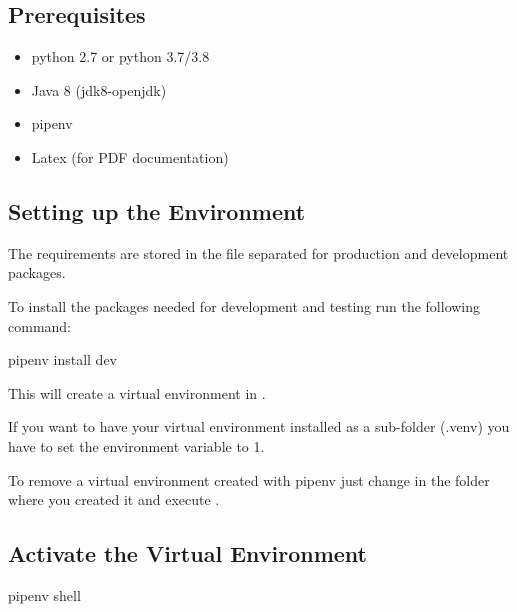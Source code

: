 \documentclass[a4paper,10pt, twoside,english]{sphinxmanual}
\begin{document}
\subsection{Prerequisites}
\label{\detokenize{setup_development_testing:prerequisites}}\begin{itemize}
\item {} 
python 2.7 or python 3.7/3.8

\item {} 
Java 8 (jdk8-openjdk)

\item {} 
pipenv

\item {} 
Latex (for PDF documentation)

\end{itemize}


\subsection{Setting up the Environment}
\label{\detokenize{setup_development_testing:setting-up-the-environment}}
The requirements are stored in the file  separated for production and development packages.

To install the packages needed for development and testing run the following command:

\begin{sphinxVerbatim}[commandchars=\\\{\}]
\PYGZdl{} pipenv install \PYGZhy{}\PYGZhy{}dev
\end{sphinxVerbatim}

This will create a virtual environment in .

If you want to have your virtual environment installed as a sub-folder (.venv) you have to set the
environment variable  to 1.

To remove a virtual environment created with pipenv just change in the folder where you created it
and execute .


\subsection{Activate the Virtual Environment}
\label{\detokenize{setup_development_testing:activate-the-virtual-environment}}
\def\sphinxLiteralBlockLabel{\label{\detokenize{setup_development_testing:id10}}}
\begin{sphinxVerbatim}[commandchars=\\\{\}]
\PYGZdl{} pipenv shell
\end{sphinxVerbatim}
\def\sphinxLiteralBlockLabel{\label{\detokenize{setup_development_testing:id11}}}
\begin{sphinxVerbatim}[commandchars=\\\{\}]
\PYGZdl{} 
\end{sphinxVerbatim}
\end{document}
